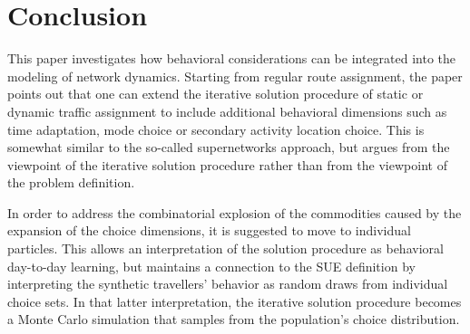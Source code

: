 





\section{Conclusion}
\label{sec:conclusion}

This paper investigates how behavioral considerations can be
integrated into the modeling of network dynamics.  Starting from
regular route assignment, the paper points out that one can extend the
iterative solution procedure of static or dynamic traffic assignment
to include additional behavioral dimensions such as time adaptation,
mode choice or secondary activity location choice.  This is somewhat
similar to the so-called supernetworks approach, but argues from the
viewpoint of the iterative solution procedure rather than from the
viewpoint of the problem definition.

In order to address the combinatorial explosion of the commodities
caused by the expansion of the choice dimensions, it is suggested to
move to individual particles.  This allows an interpretation of the
solution procedure as behavioral day-to-day learning, but maintains a
connection to the SUE definition by interpreting the synthetic
travellers' behavior as random draws from individual choice sets.  In
that latter interpretation, the iterative solution procedure becomes a
Monte Carlo simulation that samples from the population's choice
distribution.

